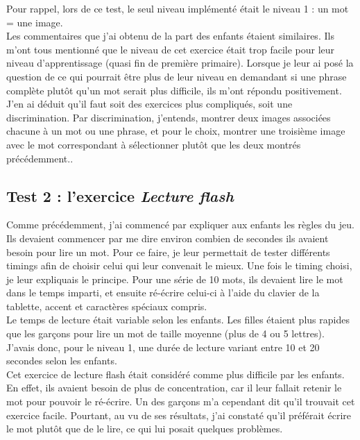 Pour rappel, lors de ce test, le seul niveau implémenté était le niveau 1 : un mot = une image.\\

Les commentaires que j'ai obtenu de la part des enfants étaient similaires. Ils m'ont tous mentionné que le niveau de cet exercice était trop facile pour leur niveau d'apprentissage (quasi fin de première primaire). Lorsque je leur ai posé la question de ce qui pourrait être plus de leur niveau en demandant si une phrase complète plutôt qu'un mot serait plus difficile, ils m'ont répondu positivement. J'en ai déduit qu'il faut soit des exercices plus compliqués, soit une discrimination. Par discrimination, j'entends, montrer deux images associées chacune à un mot ou une phrase, et pour le choix, montrer une troisième image avec le mot correspondant à sélectionner plutôt que les deux montrés précédemment..

\subsection{Test 2 : l'exercice \textit{Lecture flash} \label{testFlash}}
Comme précédemment, j'ai commencé par expliquer aux enfants les règles du jeu.
Ils devaient commencer par me dire environ combien de secondes ils avaient besoin pour lire un mot. Pour ce faire, je leur permettait de tester différents timings afin de choisir celui qui leur convenait le mieux. Une fois le timing choisi, je leur expliquais le principe. Pour une série de 10 mots, ils devaient lire le mot dans le temps imparti, et ensuite ré-écrire celui-ci à l'aide du clavier de la tablette, accent et caractères spéciaux compris.\\

Le temps de lecture était variable selon les enfants. Les filles étaient plus rapides que les garçons pour lire un mot de taille moyenne (plus de 4 ou 5 lettres). J'avais donc, pour le niveau 1, une durée de lecture variant entre 10 et 20 secondes selon les enfants.\\

Cet exercice de lecture flash était considéré comme plus difficile par les enfants. En effet, ils avaient besoin de plus de concentration, car il leur fallait retenir le mot pour pouvoir le ré-écrire. Un des garçons m'a cependant dit qu'il trouvait cet exercice facile. Pourtant, au vu de ses résultats, j'ai constaté qu'il préférait écrire le mot plutôt que de le lire, ce qui lui posait quelques problèmes.\\

